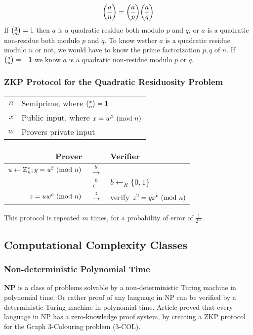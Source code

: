 $$\dlegendre{a}{n} =\dlegendre{a}{p}\dlegendre{a}{q}$$
If $\legendre{a}{n} = 1$ then $a$ is a quadratic residue both modulo $p$ and $q$, or $a$ is a quadratic non-residue both modulo $p$ and $q$.
To know wether $a$ is a quadratic residue modulo $n$ or not, we would have to know the prime factorization $p, q$ of $n$.
\newline
If $\legendre{a}{n} = -1$ we know $a$ is a quadratic non-residue modulo $p$ or $q$.


\subsubsection{ZKP Protocol for the Quadratic Residuosity Problem}

\begin{center}
	\begin{tabular}{rl}
		$n$ & Semiprime, where $\legendre{x}{n} = 1$\\
 		$x$ & Public input, where $x = w^2 \ (\mathrm{mod}\ n)$\\
 		$w$ & Provers private input\\
	\end{tabular}
\end{center}


\begin{center}
	\begin{tabular}{r|c|l}
		Prover && Verifier\\
		\hline
		$u \leftarrow \Bbb{Z}_{n}^{*}; y = u^2 \ (\mathrm{mod}\ n)$ & $\xrightarrow{y}$\\
		& $\xleftarrow{b}$ & $b \leftarrow_R \{0, 1\} $\\
		$z = uw^b\ (\mathrm{mod}\ n)$ & $\xrightarrow z$ & verify $z^2 = yx^b \ (\mathrm{mod}\ n)$\\
	\end{tabular}
\end{center}
This protocol is repeated $m$ times, for a probability of error of $\frac{1}{2^m}$.

\subsection{Computational Complexity Classes}

\subsubsection{Non-deterministic Polynomial Time}

\textbf{NP} is a class of problems solvable by a non-deterministic Turing machine in polynomial time. 
Or rather proof of any language in NP can be verified by a deterministic Turing machine in polynomial time.
\bigskip
\newline
Article \cite{GMW} proved that every language in NP has a zero-knowledge proof system, by creating a ZKP protocol for the Graph 3-Colouring problem (3-COL).

